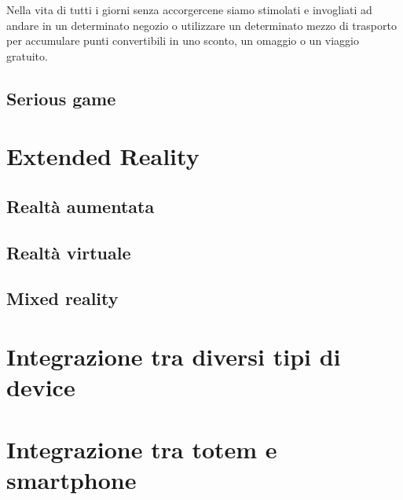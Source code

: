 Nella vita di tutti i giorni senza accorgercene siamo stimolati e invogliati ad andare in un determinato negozio o utilizzare un determinato mezzo di trasporto per accumulare punti convertibili in uno sconto, un omaggio o un viaggio gratuito.
%
\subsection{Serious game}

%
\section{Extended Reality}

\subsection{Realtà aumentata}

\subsection{Realtà virtuale}
\subsection{Mixed reality}
%
\section{Integrazione tra diversi tipi di device}
\section{Integrazione tra totem e smartphone}